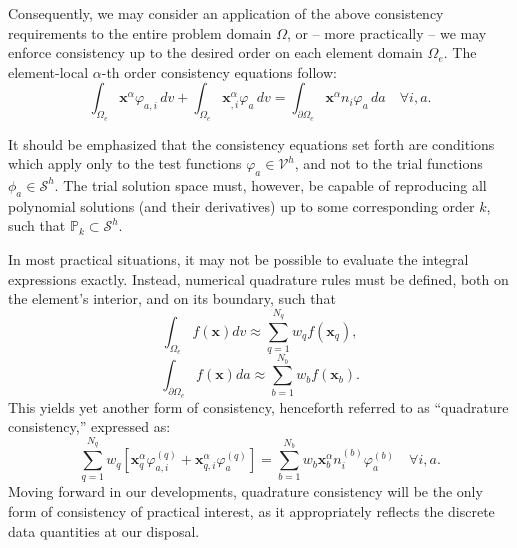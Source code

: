 Consequently, we may consider an application of the above consistency requirements to the entire problem domain $\Omega$, or -- more practically -- we may enforce consistency up to the desired order on each element domain $\Omega_e$. The element-local $\alpha$-th order consistency equations follow:
\begin{equation}
  \int_{\Omega_e} \mathbf{x}^{\alpha} \varphi_{a,i} \, dv + \int_{\Omega_e} \mathbf{x}^{\alpha}_{,i} \varphi_a \, dv = \int_{\partial \Omega_e} \mathbf{x}^{\alpha} n_i \varphi_a \, da \quad \forall i, a.
  \label{eq:consistency}
\end{equation}

It should be emphasized that the consistency equations set forth are conditions which apply only to the test functions $\varphi_a \in \mathcal{V}^h$, and not to the trial functions $\phi_a \in \mathcal{S}^h$. The trial solution space must, however, be capable of reproducing all polynomial solutions (and their derivatives) up to some corresponding order $k$, such that $\mathbb{P}_k \subset \mathcal{S}^h$.

In most practical situations, it may not be possible to evaluate the integral expressions exactly. Instead, numerical quadrature rules must be defined, both on the element's interior, and on its boundary, such that
\begin{equation}
  \int_{\Omega_e} f(\mathbf{x}) dv \approx \sum_{q=1}^{N_q} w_q f(\mathbf{x}_q),
\end{equation}
\begin{equation}
  \int_{\partial \Omega_e} f(\mathbf{x}) da \approx \sum_{b=1}^{N_b} w_b f(\mathbf{x}_b).
\end{equation}
This yields yet another form of consistency, henceforth referred to as ``quadrature consistency,'' expressed as:
\begin{equation}
  \sum_{q=1}^{N_q} w_q \left[ \mathbf{x}_q^{\alpha} \varphi^{(q)}_{a,i} + \mathbf{x}^{\alpha}_{q,i} \varphi^{(q)}_a \right] = \sum_{b=1}^{N_b} w_b \mathbf{x}_b^{\alpha} n^{(b)}_i \varphi^{(b)}_a \quad \forall i, a.
  \label{eq:quadrature_consistency}
\end{equation}
Moving forward in our developments, quadrature consistency will be the only form of consistency of practical interest, as it appropriately reflects the discrete data quantities at our disposal.


